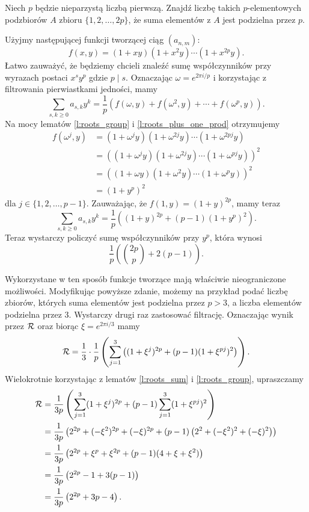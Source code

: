 \documentclass{scrartcl}
\begin{document}
    \begin{example}[IMO 1995/6]
        Niech $p$ będzie nieparzystą liczbą pierwszą. Znajdź liczbę takich $p$-elementowych podzbiorów $A$ zbioru $\{1,2,\ldots,2p\}$, że suma elementów z $A$ jest podzielna przez $p$.
    \end{example}
    \begin{solution}
        Użyjmy następującej funkcji tworzącej ciąg $(a_{n,m})$:
        $$ f(x, y) = (1 + xy)(1 + x^2y)\cdots(1 + x^{2p}y). $$
        Łatwo zauważyć, że będziemy chcieli znaleźć sumę współczynników przy wyrazach postaci $x^s y^p$ gdzie $p\mid s$. Oznaczając $\omega = e^{2\pi i / p}$ i korzystając z filtrowania pierwiastkami jedności, mamy
        $$ \sum_{s,k\geq 0} a_{s,k}y^k = \frac{1}{p}\left(f(\omega, y) + f(\omega^2, y) + \cdots + f(\omega^p, y)\right). $$
        Na mocy lematów \ref{l:roots_group} i \ref{l:roots_plus_one_prod} otrzymujemy
        \begin{align*}
            f(\omega^j, y) &= (1 + \omega^j y)(1 + \omega^{2j}y)\cdots(1 + \omega^{2pj}y) \\
                           &= \left((1 + \omega^j y)(1 + \omega^{2j}y)\cdots(1 + \omega^{pj}y)\right)^2 \\
                           &= \left((1 + \omega y)(1 + \omega^2 y)\cdots(1 + \omega^p y)\right)^2 \\
                           &= (1 + y^p)^2
        \end{align*}
        dla $j \in\{1, 2, \ldots, p-1\}$. Zauważając, że $f(1, y) = (1 + y)^{2p}$, mamy teraz
        $$ \sum_{s,k\geq 0} a_{s,k}y^k = \frac{1}{p}\left((1 + y)^{2p} + (p - 1)(1 + y^p)^2\right). $$
        Teraz wystarczy policzyć sumę współczynników przy $y^p$, która wynosi
        $$ \frac{1}{p}\left(\binom{2p}{p} + 2(p - 1)\right). $$
    \end{solution}

    Wykorzystane w ten sposób funkcje tworzące mają właściwie nieograniczone możliwości. Modyfikując powyższe zdanie, możemy na przykład podać liczbę zbiorów, których suma elementów jest podzielna przez $p > 3$, a liczba elementów podzielna przez $3$. Wystarczy drugi raz zastosować filtrację. Oznaczając wynik przez $\mathcal R$ oraz biorąc $\xi = e^{2\pi i / 3}$ mamy
    $$ \mathcal R = \frac{1}{3}\cdot\frac{1}{p}\left(\sum_{j = 1}^3\left((1 + \xi^j)^{2p} + (p - 1)(1 + \xi^{pj})^2\right)\right). $$
    Wielokrotnie korzystając z lematów \ref{l:roots_sum} i \ref{l:roots_group}, upraszczamy
    \begin{align*}
        \mathcal R &= \frac{1}{3p}\left(\sum_{j = 1}^3 (1 + \xi^j)^{2p} + (p - 1)\sum_{j = 1}^3 (1 + \xi^{pj})^2\right) \\
          &= \frac{1}{3p}\left(2^{2p} + (-\xi^2)^{2p} + (-\xi)^{2p} + (p - 1)\left(2^2 + (-\xi^2)^2 + (-\xi)^2\right)\right) \\
          &= \frac{1}{3p}\left(2^{2p} + \xi^p + \xi^{2p} + (p - 1)(4 + \xi + \xi^2)\right) \\
          &= \frac{1}{3p}\left(2^{2p} - 1 + 3(p - 1)\right) \\
          &= \frac{1}{3p}\left(2^{2p} + 3p - 4\right).
    \end{align*}
\end{document}
